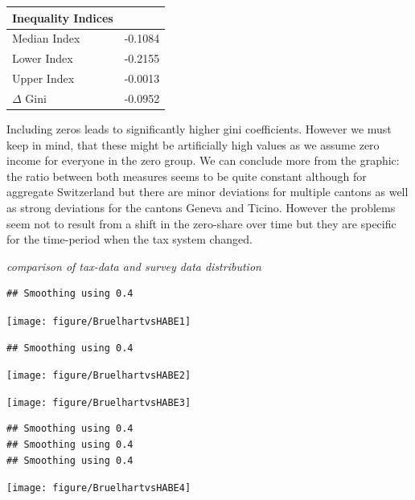 \documentclass[twoside]{article}\usepackage[]{graphicx}\usepackage[]{color}
\makeatletter
\newenvironment{kframe}{%
 \def\at@end@of@kframe{}%
 \ifinner\ifhmode%
  \def\at@end@of@kframe{\end{minipage}}%
  \begin{minipage}{\columnwidth}%
 \fi\fi%
 \def\FrameCommand##1{\hskip\@totalleftmargin \hskip-\fboxsep
 \colorbox{shadecolor}{##1}\hskip-\fboxsep
     \hskip-\linewidth \hskip-\@totalleftmargin \hskip\columnwidth}%
 \MakeFramed {\advance\hsize-\width
   \@totalleftmargin\z@ \linewidth\hsize
   \@setminipage}}%
 {\par\unskip\endMakeFramed%
 \at@end@of@kframe}
\newenvironment{knitrout}{}{} %
\makeatother
\begin{document}
\begin{multicols}{2}
\begin{knitrout}
\end{knitrout}

%
\begin{table}[!tbp]
\begin{center}
\begin{tabular}{ll}
\hline\hline
\multicolumn{1}{l}{Inequality Indices}&\multicolumn{1}{c}{}\tabularnewline
\hline
Median Index&-0.1084\tabularnewline
Lower Index&-0.2155\tabularnewline
Upper Index&-0.0013\tabularnewline
$\Delta$ Gini&-0.0952\tabularnewline
\hline
\end{tabular}
\end{center}
\end{table}




Including zeros leads to significantly higher gini coefficients. However we must keep in mind, that these might be artificially high values as we assume zero income for everyone in the zero group. We can conclude more from the graphic: the ratio between both measures seems to be quite constant although for aggregate Switzerland but there are minor deviations for multiple cantons as well as strong deviations for the cantons Geneva and Ticino. However the problems seem not to result from a shift in the zero-share over time but they are specific for the time-period when the tax system changed. 

\emph{comparison of tax-data and survey data distribution}




\begin{knitrout}
\color{fgcolor}\begin{kframe}
\begin{verbatim}
## Smoothing using 0.4
\end{verbatim}
\end{kframe}
\texttt{[image: figure/BruelhartvsHABE1]} 
\begin{kframe}\begin{verbatim}
## Smoothing using 0.4
\end{verbatim}
\end{kframe}
\texttt{[image: figure/BruelhartvsHABE2]} 

\texttt{[image: figure/BruelhartvsHABE3]} 
\begin{kframe}\begin{verbatim}
## Smoothing using 0.4
## Smoothing using 0.4
## Smoothing using 0.4
\end{verbatim}
\end{kframe}
\texttt{[image: figure/BruelhartvsHABE4]} 


\end{knitrout}
\end{multicols}
\end{document}
